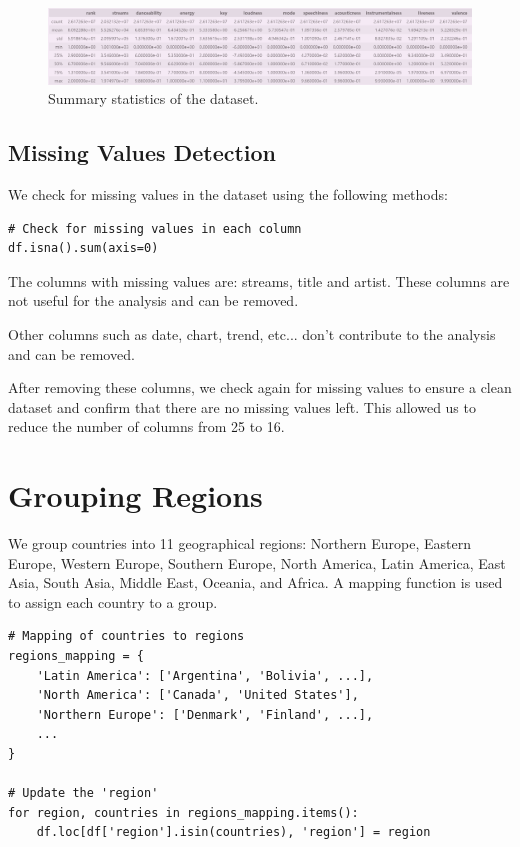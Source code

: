 \begin{figure}[h]
    \centering
    \includegraphics[width=1.1\textwidth]{media/describe.png} 
    \caption{Summary statistics of the dataset.}
    \label{df.describe()}
\end{figure}




\subsection{Missing Values Detection}

We check for missing values in the dataset using the following methods:

\begin{verbatim}
# Check for missing values in each column
df.isna().sum(axis=0)
\end{verbatim}

The columns with missing values are: streams, title and artist. These columns are not useful for the analysis and can be removed.


Other columns such as date, chart, trend, etc... don't contribute to the analysis and can be removed.


After removing these columns, we check again for missing values to ensure a clean dataset and confirm that there are no missing values left.
This allowed us to reduce the number of columns from 25 to 16.



\section{Grouping Regions}

We group countries into 11 geographical regions: Northern Europe, Eastern Europe, Western Europe, Southern Europe, North America, Latin America, East Asia, South Asia, Middle East, Oceania, and Africa. A mapping function is used to assign each country to a group.

\begin{verbatim}
# Mapping of countries to regions
regions_mapping = {
    'Latin America': ['Argentina', 'Bolivia', ...],
    'North America': ['Canada', 'United States'],
    'Northern Europe': ['Denmark', 'Finland', ...],
    ...
}
    
# Update the 'region' 
for region, countries in regions_mapping.items():
    df.loc[df['region'].isin(countries), 'region'] = region
\end{verbatim}




